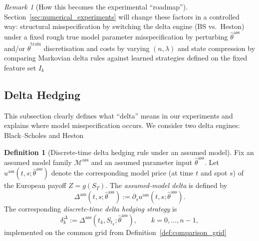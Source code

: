 \documentclass[12pt,a4paper]{article}
\theoremstyle{definition}
\newtheorem{definition}{Definition}[section]
\theoremstyle{plain}
\theoremstyle{remark}
\newtheorem{remark}{Remark}[section]
\theoremstyle{plain}
\begin{document}
\begin{remark}[How this becomes the experimental ``roadmap'']
\label{rem:roadmap_sections_6_7}
Section~\ref{sec:numerical_experiments} will change these factors in a controlled way:
structural misspecification by switching the delta engine (BS vs.\ Heston) under a fixed rough true model \cite{BlackScholes1973,Heston1993,BayerFriz2016}
parameter misspecification by perturbing $\hat\theta^{\mathrm{ass}}$ and/or $\hat\theta^{\mathrm{train}}$ \cite{ElKaroui1998Robustness,Horvath2021DeepRough}
discretisation and costs by varying $(n,\lambda)$ \cite{WhalleyWilmott2002,Buehler2019DeepHedging}
and state compression by comparing Markovian delta rules against learned strategies defined on the fixed feature set $I_k$ \cite{Buehler2019DeepHedging,Horvath2021DeepRough}
\end{remark}

\subsection{Delta Hedging}
\label{subsec:delta_hedging}

\noindent
This subsection clearly defines what “delta” means in our experiments and explains where model misspecification occurs.
We consider two delta engines: Black--Scholes and Heston \cite{BlackScholes1973,Heston1993}

\label{subsubsec:delta_definition}

\begin{definition}[Discrete-time delta hedging rule under an assumed model]
\label{def:delta_strategy_assumed}
Fix an assumed model family $\mathcal{M}^{\mathrm{ass}}$ and an assumed parameter input $\hat\theta^{\mathrm{ass}}$.
Let $u^{\mathrm{ass}}(t,s;\hat\theta^{\mathrm{ass}})$ denote the corresponding model price (at time $t$ and spot $s$)
of the European payoff $Z=g(S_T)$.
The \emph{assumed-model delta} is defined by
\[
\Delta^{\mathrm{ass}}(t,s;\hat\theta^{\mathrm{ass}}) := \partial_s u^{\mathrm{ass}}(t,s;\hat\theta^{\mathrm{ass}}).
\]
The corresponding \emph{discrete-time delta hedging strategy} is
\begin{equation}
\label{eq:delta_discrete_strategy}
\delta^{\Delta}_k
:=
\Delta^{\mathrm{ass}}(t_k,S_{t_k};\hat\theta^{\mathrm{ass}}),
\qquad k=0,\dots,n-1,
\end{equation}
implemented on the common grid from Definition~\ref{def:comparison_grid} \cite{BlackScholes1973,Heston1993}
\end{definition}
\end{document}

